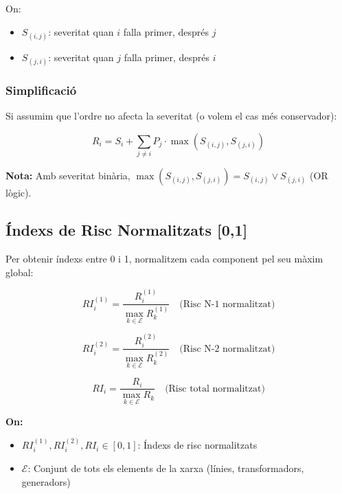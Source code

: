 \documentclass[11pt,a4paper]{article}
\begin{document}
On:
\begin{itemize}
    \item $S_{(i,j)}$: severitat quan $i$ falla primer, després $j$
    \item $S_{(j,i)}$: severitat quan $j$ falla primer, després $i$
\end{itemize}

\subsubsection*{Simplificació}

Si assumim que l'ordre no afecta la severitat (o volem el cas més conservador):

\begin{equation}
R_i = S_i + \sum_{j \neq i} P_j \cdot \max(S_{(i,j)}, S_{(j,i)})
\end{equation}

\textbf{Nota:} Amb severitat binària, $\max(S_{(i,j)}, S_{(j,i)}) = S_{(i,j)} \lor S_{(j,i)}$ (OR lògic).

\subsection{Índexs de Risc Normalitzats [0,1]}

Per obtenir índexs entre 0 i 1, normalitzem cada component pel seu màxim global:

\begin{equation}
\boxed{RI_i^{(1)} = \frac{R_i^{(1)}}{\max_{k \in \mathcal{E}} R_k^{(1)}}} \quad \text{(Risc N-1 normalitzat)}
\end{equation}

\begin{equation}
\boxed{RI_i^{(2)} = \frac{R_i^{(2)}}{\max_{k \in \mathcal{E}} R_k^{(2)}}} \quad \text{(Risc N-2 normalitzat)}
\end{equation}

\begin{equation}
\boxed{RI_i = \frac{R_i}{\max_{k \in \mathcal{E}} R_k}} \quad \text{(Risc total normalitzat)}
\end{equation}

\textbf{On:}
\begin{itemize}
    \item $RI_i^{(1)}, RI_i^{(2)}, RI_i \in [0, 1]$: Índexs de risc normalitzats
    \item $\mathcal{E}$: Conjunt de tots els elements de la xarxa (línies, transformadors, generadors)
\end{itemize}
\end{document}
